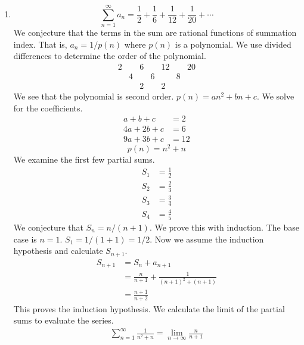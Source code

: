 {\begin{Solution}
  \label{solution sum rational alternate geometric}
  \begin{enumerate}
  \item 
    \[
    \sum_{n = 1}^\infty a_n = \frac{1}{2} + \frac{1}{6} + \frac{1}{12} + \frac{1}{20} + \cdots
    \]
    We conjecture that the terms in the sum are rational functions of 
    summation index.  That is, $a_n = 1 / p(n)$ 
    where $p(n)$ is a polynomial.  We use divided differences
    to determine the order of the polynomial.
    \[
    \begin{matrix}
      2  &   & 6  &   & 12 &   & 20 \\
      & 4 &    & 6 &    & 8 &    \\
      &   & 2  &   & 2  &   &    
    \end{matrix}
    \]
    We see that the polynomial is second order.  $p(n) = a n^2 + b n + c$.
    We solve for the coefficients.
    \begin{align*}
      a + b + c &= 2
      \\
      4 a + 2 b + c &= 6
      \\
      9 a + 3 b + c &= 12
    \end{align*}
    \[
    p(n) = n^2 + n
    \]
    We examine the first few partial sums.
    \begin{align*}
      S_1 &= \frac{1}{2}
      \\
      S_2 &= \frac{2}{3}
      \\
      S_3 &= \frac{3}{4}
      \\
      S_4 &= \frac{4}{5}
    \end{align*}
    We conjecture that $S_n = n / (n + 1)$.  We prove this with induction.
    The base case is $n = 1$. $S_1 = 1 / (1 + 1) = 1 / 2$.
    Now we assume the induction hypothesis and calculate $S_{n+1}$.
    \begin{align*}
      S_{n+1} &= S_n + a_{n+1}
      \\
      &= \frac{n}{n + 1} + \frac{1}{(n + 1)^2 + (n + 1)}
      \\
      &= \frac{n + 1}{n + 2}
    \end{align*}
    This proves the induction hypothesis.  We calculate the limit of the 
    partial sums to evaluate the series.
    \begin{gather*}
      \sum_{n = 1}^\infty \frac{1}{n^2 + n} = \lim_{n \to \infty} \frac{n}{n + 1}
      \\

\end{gather*}
\end{enumerate}
\end{Solution}}
